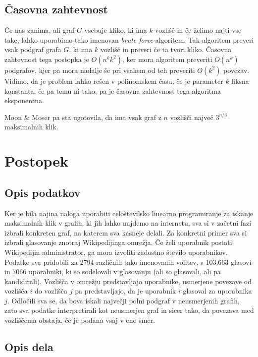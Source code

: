 \documentclass[12pt,a4paper]{amsart}
\theoremstyle{definition}
\theoremstyle{plain}
\begin{document}
\subsection{Časovna zahtevnost}
Če nas zanima, ali graf $G$ vsebuje kliko, ki ima $k$-vozlišč in če želimo najti vse take, lahko uporabimo tako imenovan \textit{brute force} algoritem. Tak algoritem preveri vsak podgraf grafa $G$, ki ima $k$ vozlišč in preveri če ta tvori kliko. Časovna zahtevnost tega postopka je $O(n^kk^2)$, ker mora algoritem preveriti $O(n^k)$ podgrafov, kjer pa mora nadalje še pri vsakem od teh preveriti $O(k^2)$ povezav. Vidimo, da je problem lahko rešen v polinomskem času, če je parameter $k$ fiksna konstanta, če pa temu ni tako, pa je časovna zahtevnost tega algoritma eksponentna.

Moon \& Moser pa sta ugotovila, da ima vsak graf z $n$ vozlišči največ $3^{n/3}$ maksimalnih klik.

\section{Postopek}
\subsection{Opis podatkov}

Ker je bila najina naloga uporabiti celoštevilsko linearno programiranje za iskanje maksimalnih klik v grafih, ki jih lahko najdemo na internetu, sva si v začetni fazi izbrali konkreten graf, na katerem sva kasneje delali. Za konkretni primer sva si izbrali glasovanje znotraj Wikipedijinga omrežja. Če želi uporabnik postati Wikipedijin administrator, ga mora izvoliti zadostno število uporabnikov. Podatke sva pridobili za 2794 različnih tako imenovanih volitev, s 103.663 glasovi in 7066 uporabniki, ki so sodelovali v glasovanju (ali so glasovali, ali pa kandidirali). Vozlišča v omrežju predstavljajo uporabnike, usmerjene povezave od vozlišča $i$ do vozlišča $j$ pa predstavljajo, da je uporabnik $i$ glasoval za uporabnika $j$. Odločili sva se, da bova iskali največji polni podgraf v neusmerjenih grafih, zato sva podatke interpretirali kot neusmerjen graf in sicer tako, da povezava med vozliščema obstaja, če je podana vsaj v eno smer.\\


\subsection{Opis dela}
\end{document}
